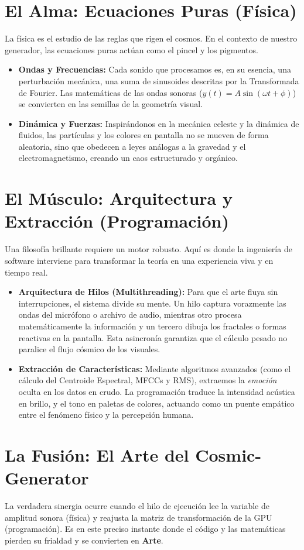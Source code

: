 \documentclass[12pt, openany]{book}
\begin{document}
\section*{El Alma: Ecuaciones Puras (Física)}
La física es el estudio de las reglas que rigen el cosmos. En el contexto de nuestro generador, las ecuaciones puras actúan como el pincel y los pigmentos.
\begin{itemize}
    \item \textbf{Ondas y Frecuencias:} Cada sonido que procesamos es, en su esencia, una perturbación mecánica, una suma de sinusoides descritas por la Transformada de Fourier. Las matemáticas de las ondas sonoras ($y(t) = A \sin(\omega t + \phi)$) se convierten en las semillas de la geometría visual.
    \item \textbf{Dinámica y Fuerzas:} Inspirándonos en la mecánica celeste y la dinámica de fluidos, las partículas y los colores en pantalla no se mueven de forma aleatoria, sino que obedecen a leyes análogas a la gravedad y el electromagnetismo, creando un caos estructurado y orgánico.
\end{itemize}

\section*{El Músculo: Arquitectura y Extracción (Programación)}
Una filosofía brillante requiere un motor robusto. Aquí es donde la ingeniería de software interviene para transformar la teoría en una experiencia viva y en tiempo real.
\begin{itemize}
    \item \textbf{Arquitectura de Hilos (Multithreading):} Para que el arte fluya sin interrupciones, el sistema divide su mente. Un hilo captura vorazmente las ondas del micrófono o archivo de audio, mientras otro procesa matemáticamente la información y un tercero dibuja los fractales o formas reactivas en la pantalla. Esta asincronía garantiza que el cálculo pesado no paralice el flujo cósmico de los visuales.
    \item \textbf{Extracción de Características:} Mediante algoritmos avanzados (como el cálculo del Centroide Espectral, MFCCs y RMS), extraemos la \textit{emoción} oculta en los datos en crudo. La programación traduce la intensidad acústica en brillo, y el tono en paletas de colores, actuando como un puente empático entre el fenómeno físico y la percepción humana.
\end{itemize}

\section*{La Fusión: El Arte del Cosmic-Generator}
La verdadera sinergia ocurre cuando el hilo de ejecución lee la variable de amplitud sonora (física) y reajusta la matriz de transformación de la GPU (programación). Es en este preciso instante donde el código y las matemáticas pierden su frialdad y se convierten en \textbf{Arte}.
\end{document}
